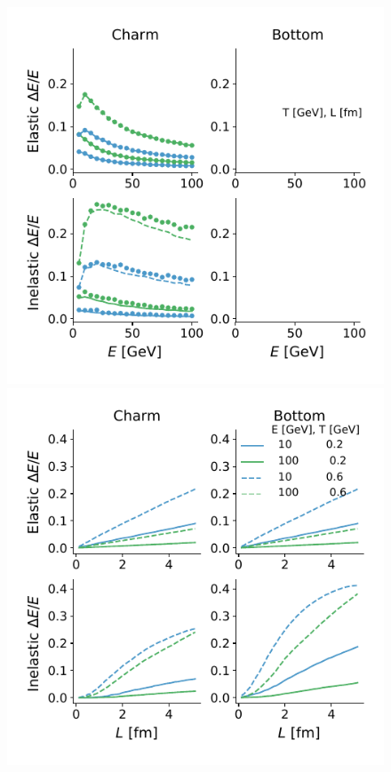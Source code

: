 \documentclass[aps, prc, reprint, amsmath, groupedaddress, nofootinbib]{revtex4-1}
\begin{document}
\begin{figure}
\includegraphics[width=\columnwidth]{E_Eloss.pdf}
\includegraphics[width=\columnwidth]{L_Eloss.pdf}
\end{figure}
\end{document}
